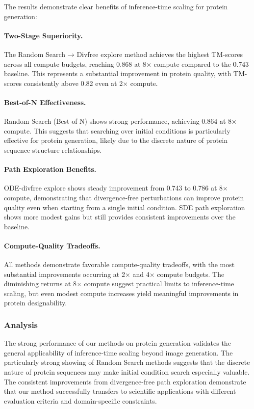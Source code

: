 \documentclass{article}
\begin{document}
The results demonstrate clear benefits of inference-time scaling for protein generation:

\paragraph{Two-Stage Superiority.} The Random Search → Divfree explore method achieves the highest TM-scores across all compute budgets, reaching 0.868 at 8× compute compared to the 0.743 baseline. This represents a substantial improvement in protein quality, with TM-scores consistently above 0.82 even at 2× compute.

\paragraph{Best-of-N Effectiveness.} Random Search (Best-of-N) shows strong performance, achieving 0.864 at 8× compute. This suggests that searching over initial conditions is particularly effective for protein generation, likely due to the discrete nature of protein sequence-structure relationships.

\paragraph{Path Exploration Benefits.} ODE-divfree explore shows steady improvement from 0.743 to 0.786 at 8× compute, demonstrating that divergence-free perturbations can improve protein quality even when starting from a single initial condition. SDE path exploration shows more modest gains but still provides consistent improvements over the baseline.

\paragraph{Compute-Quality Tradeoffs.} All methods demonstrate favorable compute-quality tradeoffs, with the most substantial improvements occurring at 2× and 4× compute budgets. The diminishing returns at 8× compute suggest practical limits to inference-time scaling, but even modest compute increases yield meaningful improvements in protein designability.

\subsubsection{Analysis}

The strong performance of our methods on protein generation validates the general applicability of inference-time scaling beyond image generation. The particularly strong showing of Random Search methods suggests that the discrete nature of protein sequences may make initial condition search especially valuable. The consistent improvements from divergence-free path exploration demonstrate that our method successfully transfers to scientific applications with different evaluation criteria and domain-specific constraints.
\end{document}

